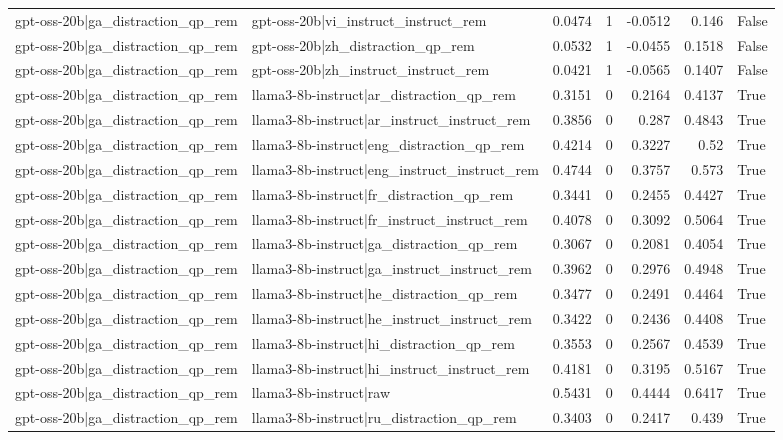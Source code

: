 \begin{table}
\begin{tabular}{l l r r r r l}
gpt-oss-20b|ga_distraction_qp_rem & gpt-oss-20b|vi_instruct_instruct_rem & 0.0474 & 1 & -0.0512 & 0.146 & False \\
gpt-oss-20b|ga_distraction_qp_rem & gpt-oss-20b|zh_distraction_qp_rem & 0.0532 & 1 & -0.0455 & 0.1518 & False \\
gpt-oss-20b|ga_distraction_qp_rem & gpt-oss-20b|zh_instruct_instruct_rem & 0.0421 & 1 & -0.0565 & 0.1407 & False \\
gpt-oss-20b|ga_distraction_qp_rem & llama3-8b-instruct|ar_distraction_qp_rem & 0.3151 & 0 & 0.2164 & 0.4137 & True \\
gpt-oss-20b|ga_distraction_qp_rem & llama3-8b-instruct|ar_instruct_instruct_rem & 0.3856 & 0 & 0.287 & 0.4843 & True \\
gpt-oss-20b|ga_distraction_qp_rem & llama3-8b-instruct|eng_distraction_qp_rem & 0.4214 & 0 & 0.3227 & 0.52 & True \\
gpt-oss-20b|ga_distraction_qp_rem & llama3-8b-instruct|eng_instruct_instruct_rem & 0.4744 & 0 & 0.3757 & 0.573 & True \\
gpt-oss-20b|ga_distraction_qp_rem & llama3-8b-instruct|fr_distraction_qp_rem & 0.3441 & 0 & 0.2455 & 0.4427 & True \\
gpt-oss-20b|ga_distraction_qp_rem & llama3-8b-instruct|fr_instruct_instruct_rem & 0.4078 & 0 & 0.3092 & 0.5064 & True \\
gpt-oss-20b|ga_distraction_qp_rem & llama3-8b-instruct|ga_distraction_qp_rem & 0.3067 & 0 & 0.2081 & 0.4054 & True \\
gpt-oss-20b|ga_distraction_qp_rem & llama3-8b-instruct|ga_instruct_instruct_rem & 0.3962 & 0 & 0.2976 & 0.4948 & True \\
gpt-oss-20b|ga_distraction_qp_rem & llama3-8b-instruct|he_distraction_qp_rem & 0.3477 & 0 & 0.2491 & 0.4464 & True \\
gpt-oss-20b|ga_distraction_qp_rem & llama3-8b-instruct|he_instruct_instruct_rem & 0.3422 & 0 & 0.2436 & 0.4408 & True \\
gpt-oss-20b|ga_distraction_qp_rem & llama3-8b-instruct|hi_distraction_qp_rem & 0.3553 & 0 & 0.2567 & 0.4539 & True \\
gpt-oss-20b|ga_distraction_qp_rem & llama3-8b-instruct|hi_instruct_instruct_rem & 0.4181 & 0 & 0.3195 & 0.5167 & True \\
gpt-oss-20b|ga_distraction_qp_rem & llama3-8b-instruct|raw & 0.5431 & 0 & 0.4444 & 0.6417 & True \\
gpt-oss-20b|ga_distraction_qp_rem & llama3-8b-instruct|ru_distraction_qp_rem & 0.3403 & 0 & 0.2417 & 0.439 & True \\

\end{tabular}
\end{table}
